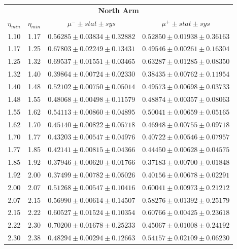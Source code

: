 \begin{table}
  \centering
  \begin{tabular}{cccc}
    \toprule
    \multicolumn{4}{c}{\textbf{North Arm}} \\
    \textbf{$\eta_{min}$} & 
    \textbf{$\eta_{min}$} & 
    \textbf{$\mu^{-}\pm stat \pm sys$} & 
    \textbf{$\mu^{+}\pm stat \pm sys$} \\
    \midrule
    1.10 & 1.17 & $0.56285 \pm 0.03834 \pm 0.32882$ & $0.52850 \pm 0.01938 \pm 0.36163$ \\
    1.17 & 1.25 & $0.67803 \pm 0.02249 \pm 0.13431$ & $0.49546 \pm 0.00261 \pm 0.16304$ \\
    1.25 & 1.32 & $0.69537 \pm 0.01551 \pm 0.03465$ & $0.63287 \pm 0.01285 \pm 0.08350$ \\
    1.32 & 1.40 & $0.39864 \pm 0.00724 \pm 0.02330$ & $0.38435 \pm 0.00762 \pm 0.11954$ \\
    1.40 & 1.48 & $0.52102 \pm 0.00750 \pm 0.05014$ & $0.49573 \pm 0.00698 \pm 0.03733$ \\
    1.48 & 1.55 & $0.48068 \pm 0.00498 \pm 0.11579$ & $0.48874 \pm 0.00357 \pm 0.08063$ \\
    1.55 & 1.62 & $0.54113 \pm 0.00860 \pm 0.04895$ & $0.50041 \pm 0.00659 \pm 0.05165$ \\
    1.62 & 1.70 & $0.45140 \pm 0.00822 \pm 0.05718$ & $0.46948 \pm 0.00755 \pm 0.09718$ \\
    1.70 & 1.77 & $0.43203 \pm 0.00547 \pm 0.04976$ & $0.40722 \pm 0.00546 \pm 0.07957$ \\
    1.77 & 1.85 & $0.42141 \pm 0.00815 \pm 0.04366$ & $0.44450 \pm 0.00628 \pm 0.04575$ \\
    1.85 & 1.92 & $0.37946 \pm 0.00620 \pm 0.01766$ & $0.37183 \pm 0.00700 \pm 0.01848$ \\
    1.92 & 2.00 & $0.37499 \pm 0.00782 \pm 0.05026$ & $0.40156 \pm 0.00678 \pm 0.02291$ \\
    2.00 & 2.07 & $0.51268 \pm 0.00547 \pm 0.10416$ & $0.60041 \pm 0.00973 \pm 0.21212$ \\
    2.07 & 2.15 & $0.56990 \pm 0.00614 \pm 0.14507$ & $0.58276 \pm 0.01392 \pm 0.25179$ \\
    2.15 & 2.22 & $0.60527 \pm 0.01524 \pm 0.10354$ & $0.60766 \pm 0.00425 \pm 0.23618$ \\
    2.22 & 2.30 & $0.70200 \pm 0.01678 \pm 0.25233$ & $0.45067 \pm 0.01008 \pm 0.24192$ \\
    2.30 & 2.38 & $0.48294 \pm 0.00294 \pm 0.12663$ & $0.54157 \pm 0.02109 \pm 0.06230$ \\

\end{tabular}
\end{table}
